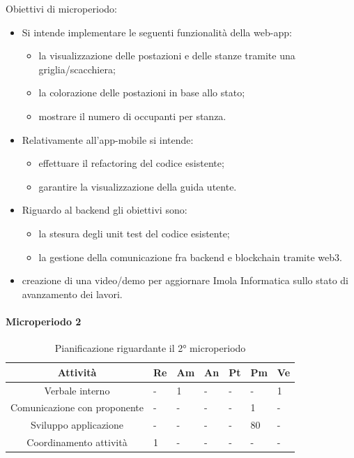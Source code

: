 Obiettivi di microperiodo:
\begin{itemize}
	\item Si intende implementare le seguenti funzionalità della web-app:
	\begin{itemize}
		\item la visualizzazione delle postazioni e delle stanze tramite una griglia/scacchiera; 
		\item la colorazione delle postazioni in base allo stato;
		\item mostrare il numero di occupanti per stanza.
	\end{itemize}
\item Relativamente all'app-mobile si intende:
\begin{itemize}
	\item effettuare il refactoring del codice esistente;
	\item garantire la visualizzazione della guida utente.
\end{itemize}
\item Riguardo al backend gli obiettivi sono:
\begin{itemize}
	\item la stesura degli unit test del codice esistente;
	\item la gestione della comunicazione fra backend e blockchain tramite web3.
\end{itemize}
\item creazione di una video/demo per aggiornare Imola Informatica sullo stato di avanzamento dei lavori.
\end{itemize}


\paragraph{Microperiodo 2}
\begin{table}[H]
	\centering
	\renewcommand{\arraystretch}{1.5}
	\begin{tabular}{|c|p{10mm}|p{10mm}|p{10mm}|p{10mm}|p{10mm}|p{10mm}|}
		\hline
		\rowcolor{lighter-grayer}
		\textbf{Attività}                         & \textbf{Re} & \textbf{Am} & \textbf{An} & \textbf{Pt} & \textbf{Pm} & \textbf{Ve} \\ \hline
		Verbale interno                                   & - & 1 & - & - & -  & 1 \\ \hline
		Comunicazione con proponente					  & - & - & - & - & 1  & - \\ \hline
		Sviluppo applicazione                             & - & - & - & - & 80 & - \\ \hline
		Coordinamento attività                            & 1 & - & - & - & -  & - \\ \hline
	\end{tabular}
	\caption{ Pianificazione riguardante il 2° microperiodo\\}
\end{table}


